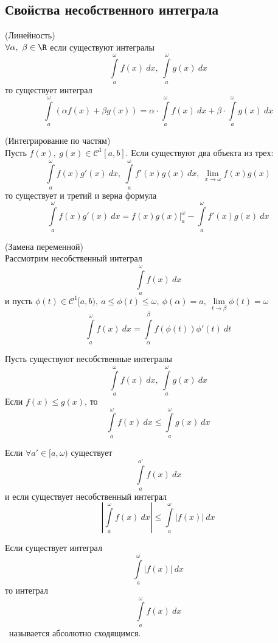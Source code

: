 \subsection{Свойства несобственного интеграла}
\setcounter{thmcount}{0}
\begin{numtheorem}
    (Линейность)\\
    $\forall \alpha,\ \beta\in \R$ если существуют интегралы
    \[\int\limits_{a}^{\omega}f(x)\ dx,\ \int\limits_{a}^{\omega}g(x)\ dx\]
    то существует интеграл
    \[\int\limits_{a}^{\omega}(\alpha f(x)+\beta g(x))=\alpha\cdot \int\limits_{a}^{\omega}f(x)\ dx+\beta\cdot \int\limits_{a}^{\omega}g(x)\ dx\]
\end{numtheorem}
\begin{numtheorem}
    (Интегрирование по частям)\\
    Пусть $f(x),\ g(x)\in \mathcal{C}^1[a,b]$. Если существуют два объекта из трех:
    \[\int\limits_{a}^{\omega} f(x)g'(x)\ dx,\ \int\limits_{a}^{\omega}f'(x)g(x)\ dx,\ \lim\limits_{x\to \omega}f(x)g(x)\]
    то существует и третий и верна формула
    \[\int\limits_{a}^{\omega}f(x)g'(x)\ dx=f(x)g(x)|_a^{\omega}-\int\limits_{a}^{\omega}f'(x)g(x)\ dx\]
\end{numtheorem}  
\begin{numtheorem}
    (Замена переменной)\\
    Рассмотрим несобственный интеграл 
    \[\int\limits_{a}^{\omega}f(x)\ dx\]
    и пусть $\phi(t)\in \mathcal{C}^1[a,b),\ a\leq \phi(t)\leq \omega,\ \phi(\alpha)=a,\ \lim\limits_{t\to \beta}\phi(t)=\omega$
    \[\int\limits_{a}^{\omega}f(x)\ dx=\int\limits_{\alpha}^{\beta} f(\phi(t))\phi'(t)\ dt\]
\end{numtheorem} 
\begin{numtheorem}
    Пусть существуют несобственные интегралы
    \[\int\limits_{a}^{\omega}f(x)\ dx,\ \int\limits_{a}^{\omega}g(x)\ dx\]
    Если $f(x)\leq g(x)$, то
    \[\int\limits_{a}^{\omega}f(x)\ dx\leq \int\limits_{a}^{\omega}g(x)\ dx\]
\end{numtheorem} 
\begin{numtheorem}
    Если $\forall a'\in [a, \omega)$ существует
    \[\int\limits_{a}^{a'}f(x)\ dx\]
    и если существует несобственный интеграл
    \[\left|\int\limits_{a}^{\omega}f(x)\ dx\right|\leq \int\limits_{a}^{\omega}|f(x)|\ dx\]
\end{numtheorem} 
\begin{definition}
    Если существует интеграл
    \[\int\limits_{a}^{\omega}|f(x)|\ dx\]
    то интеграл
    \[\int\limits_{a}^{\omega}f(x)\ dx\]\
    называется абсолютно сходящимся.
\end{definition} 
